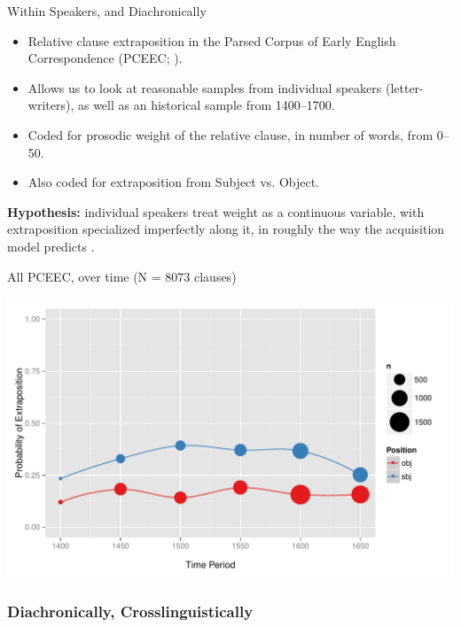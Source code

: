 \documentclass[hyperref={pdfpagelabels=false}]{beamer}
\begin{document}
\begin{frame}{Within Speakers, and Diachronically}
\begin{itemize}
	\item Relative clause extraposition in the Parsed Corpus of Early English Correspondence  (PCEEC; \citealt{pceec}).
	\item Allows us to look at reasonable samples from individual speakers (letter-writers), as well as an historical sample from 1400--1700.
	\item Coded for prosodic weight of the relative clause, in number of words, from 0--50.
	\item Also coded for extraposition from Subject vs. Object.
\end{itemize}
	\textbf{Hypothesis:} individual speakers treat weight as a continuous variable, with extraposition specialized imperfectly along it, in roughly the way the acquisition model predicts \citep[following on][]{antonmackenzie2011a}.

\end{frame}




\begin{frame}{All PCEEC, over time (N = 8073 clauses)}

\begin{center}
\includegraphics[width=1.1\textwidth]{exSbjObjYearBinned50.pdf}
\end{center}
\end{frame}


\subsubsection{Diachronically, Crosslinguistically}
\end{document}
